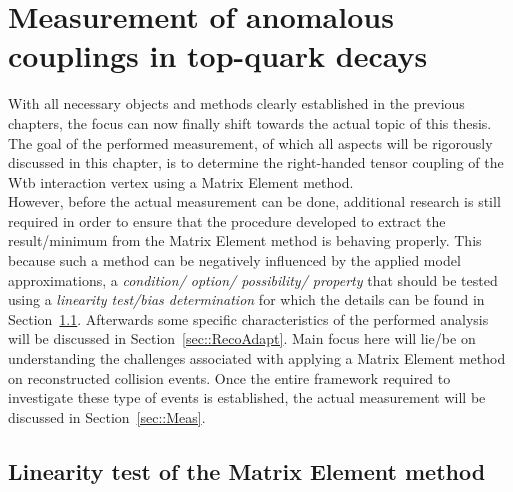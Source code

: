 \chapter{Measurement of anomalous couplings in top-quark decays} \label{ch::Analysis}

With all necessary objects and methods clearly established in the previous chapters, the focus can now finally shift towards the actual topic of this thesis.
The goal of the performed measurement, of which all aspects will be rigorously discussed in this chapter, is to determine the right-handed tensor coupling of the Wtb interaction vertex using a Matrix Element method.
\\

However, before the actual measurement can be done, additional research is still required in order to ensure that the procedure developed to extract the result/minimum from the Matrix Element method is behaving properly. This because such a method can be negatively influenced by the applied model approximations, a \textit{condition/ option/ possibility/ property} that should be tested using a \textit{linearity test/bias determination} for which the details can be found in Section~\ref{sec::CalibCurve}.
Afterwards some specific characteristics of the performed analysis will be discussed in Section~\ref{sec::RecoAdapt}.
Main focus here will lie/be on understanding the challenges associated with applying a Matrix Element method on reconstructed collision events.
Once the entire framework required to investigate these type of events is established, the actual measurement will be discussed in Section~\ref{sec::Meas}. 

\section{Linearity test of the Matrix Element method} \label{sec::CalibCurve}

